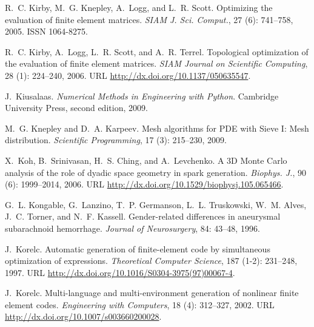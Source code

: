 \begin{thebibliography}{467}
R.~C. Kirby, M.~G. Knepley, A.~Logg, and L.~R. Scott.
\newblock Optimizing the evaluation of finite element matrices.
\newblock \emph{SIAM J. Sci. Comput.}, 27 (6): 741--758,
  2005.
\newblock ISSN 1064-8275.

R.~C. Kirby, A.~Logg, L.~R. Scott, and A.~R. Terrel.
\newblock Topological optimization of the evaluation of finite element
  matrices.
\newblock \emph{SIAM Journal on Scientific Computing}, 28
  (1): 224--240, 2006.
\newblock URL \url{http://dx.doi.org/10.1137/050635547}.

J.~Kiusalaas.
\newblock \emph{Numerical Methods in Engineering with Python}.
\newblock Cambridge University Press, second edition, 2009.

M.~G. Knepley and D.~A. Karpeev.
\newblock Mesh algorithms for {PDE} with {S}ieve {I}: {M}esh distribution.
\newblock \emph{Scientific Programming}, 17 (3): 215--230,
  2009.

X.~Koh, B.~Srinivasan, H.~S. Ching, and A.~Levchenko.
\newblock A 3{D} {M}onte {C}arlo analysis of the role of dyadic space geometry
  in spark generation.
\newblock \emph{Biophys. J.}, 90 (6): 1999--2014, 2006.
\newblock URL \url{http://dx.doi.org/10.1529/biophysj.105.065466}.

G.~L. Kongable, G.~Lanzino, T.~P. Germanson, L.~L. Truskowski, W.~M. Alves,
  J.~C. Torner, and N.~F. Kassell.
\newblock Gender-related differences in aneurysmal subarachnoid hemorrhage.
\newblock \emph{Journal of Neurosurgery}, 84: 43--48, 1996.

J.~Korelc.
\newblock Automatic generation of finite-element code by simultaneous
  optimization of expressions.
\newblock \emph{Theoretical Computer Science}, 187 (1-2):
  231--248, 1997.
\newblock URL \url{http://dx.doi.org/10.1016/S0304-3975(97)00067-4}.

J.~Korelc.
\newblock Multi-language and multi-environment generation of nonlinear finite
  element codes.
\newblock \emph{Engineering with Computers}, 18 (4):
  312--327, 2002.
\newblock URL \url{http://dx.doi.org/10.1007/s003660200028}.


\end{thebibliography}
